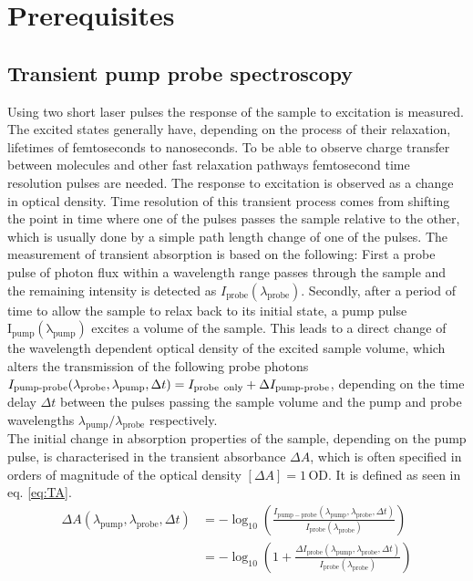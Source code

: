 \documentclass[twoside,openright,listof=numbered]{scrreprt}
\begin{document}
\tableofcontents


\chapter{Prerequisites}

\section{Transient pump probe spectroscopy}
Using two short laser pulses the response of the sample to excitation is measured. The excited states generally have, depending on the process of their relaxation, lifetimes of femtoseconds to nanoseconds. To be able to observe charge transfer between molecules and other fast relaxation pathways femtosecond time resolution pulses are needed. The response to excitation is observed as a change in optical density. Time resolution of this transient process comes from shifting the point in time where one of the pulses passes the sample relative to the other, which is usually done by a simple path length change of one of the pulses.\newline
The measurement of transient absorption is based on the following: First a probe pulse of photon flux within a wavelength range passes through the sample and the remaining intensity is detected as $I_\text{probe}(\lambda_\text{probe})$. 
Secondly, after a period of time to allow the sample to relax back to its initial state, a pump pulse $\mathrm{I_{pump}(\lambda_{pump})}$ excites a volume of the sample. This leads to a direct change of the wavelength dependent optical density of the excited sample volume, which alters the transmission of the following probe photons $I_\text{pump-probe}(\lambda_\text{probe}, \lambda_\text{pump}, \Delta t) = I_\text{probe\, only}+\Delta I_\text{pump-probe}$, depending on the time delay $\Delta t$ between the pulses passing the sample volume and the pump and probe wavelengths $\lambda_\text{pump}/\lambda_\text{probe}$ respectively. \\
The initial change in absorption properties of the sample, depending on the pump pulse, is characterised in the transient absorbance $\Delta A$, which is often specified in orders of magnitude of the optical density $\left[\Delta A\right] = 1\, \text{OD}$. It is defined as seen in eq. \ref{eq:TA}.
\begin{equation}\label{eq:TA}
\begin{split}
\Delta A(\lambda_{\mathrm{pump}}, \lambda_{\mathrm{probe}}, \Delta t)&=-\log _{10}\left(\frac{I_{\mathrm{pump}-\mathrm{probe}}\left(\lambda_{\mathrm{pump}}, \lambda_{\mathrm{probe}}, \Delta t\right)}{I_{\mathrm{probe}}\left(\lambda_{\mathrm{probe}}\right)}\right)\\
&=-\log _{10}\left(1+\frac{\Delta I_{\mathrm{probe}}\left(\lambda_{\mathrm{pump}}, \lambda_{\mathrm{probe}}, \Delta t\right)}{I_{\mathrm{probe}}\left(\lambda_{\mathrm{probe}}\right)}\right)
\end{split}
\end{equation}
\end{document}
